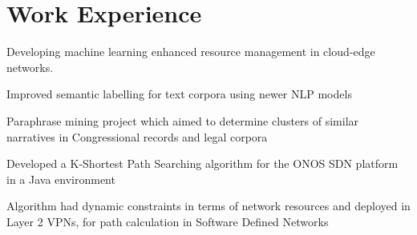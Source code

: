 \documentclass[]{onepage}
\begin{document}
\begin{minipage}[t]{0.66\textwidth}

\section{Work Experience}

\vspace{0.4cm}
\begin{tightemize}
\item Developing machine learning enhanced resource management in cloud-edge networks.
\end{tightemize}

\vspace{0.1cm}
\begin{tightemize}
\item Improved semantic labelling for text corpora using newer NLP models
\item Paraphrase mining project which aimed to determine clusters of similar narratives in Congressional records and legal corpora
\end{tightemize}
\vspace{0.1cm}

\vspace{0.07cm} %
\begin{tightemize}
\item Developed a K-Shortest Path Searching algorithm for the ONOS SDN platform in a Java environment
\item Algorithm had dynamic constraints in terms of network resources  and deployed in Layer 2 VPNs, for path calculation in Software Defined Networks
\end{tightemize}
\vspace{0.1cm}




\end{minipage}
\end{document}
